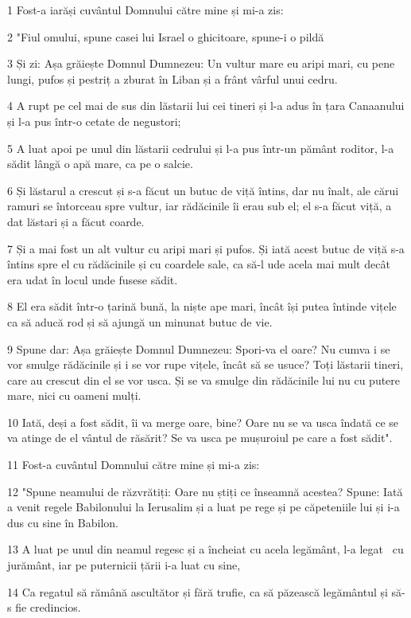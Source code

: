 \par 1 Fost-a iarăși cuvântul Domnului către mine și mi-a zis:
\par 2 "Fiul omului, spune casei lui Israel o ghicitoare, spune-i o pildă
\par 3 Și zi: Așa grăiește Domnul Dumnezeu: Un vultur mare eu aripi mari, cu pene lungi, pufos și pestriț a zburat în Liban și a frânt vârful unui cedru.
\par 4 A rupt pe cel mai de sus din lăstarii lui cei tineri și l-a adus în țara Canaanului și l-a pus într-o cetate de negustori;
\par 5 A luat apoi pe unul din lăstarii cedrului și l-a pus într-un pământ roditor, l-a sădit lângă o apă mare, ca pe o salcie.
\par 6 Și lăstarul a crescut și s-a făcut un butuc de viță întins, dar nu înalt, ale cărui ramuri se întorceau spre vultur, iar rădăcinile îi erau sub el; el s-a făcut viță, a dat lăstari și a făcut coarde.
\par 7 Și a mai fost un alt vultur cu aripi mari și pufos. Și iată acest butuc de viță s-a întins spre el cu rădăcinile și cu coardele sale, ca să-l ude acela mai mult decât era udat în locul unde fusese sădit.
\par 8 El era sădit într-o țarină bună, la niște ape mari, încât își putea întinde vițele ca să aducă rod și să ajungă un minunat butuc de vie.
\par 9 Spune dar: Așa grăiește Domnul Dumnezeu: Spori-va el oare? Nu cumva i se vor smulge rădăcinile și i se vor rupe vițele, încât să se usuce? Toți lăstarii tineri, care au crescut din el se vor usca. Și se va smulge din rădăcinile lui nu cu putere mare, nici cu oameni mulți.
\par 10 Iată, deși a fost sădit, îi va merge oare, bine? Oare nu se va usca îndată ce se va atinge de el vântul de răsărit? Se va usca pe mușuroiul pe care a fost sădit".
\par 11 Fost-a cuvântul Domnului către mine și mi-a zis:
\par 12 "Spune neamului de răzvrătiți: Oare nu știți ce înseamnă acestea? Spune: Iată a venit regele Babilonului la Ierusalim și a luat pe rege și pe căpeteniile lui și i-a dus cu sine în Babilon.
\par 13 A luat pe unul din neamul regesc și a încheiat cu acela legământ, l-a legat  cu jurământ, iar pe puternicii țării i-a luat cu sine,
\par 14 Ca regatul să rămână ascultător și fără trufie, ca să păzească legământul și să-s fie credincios.
